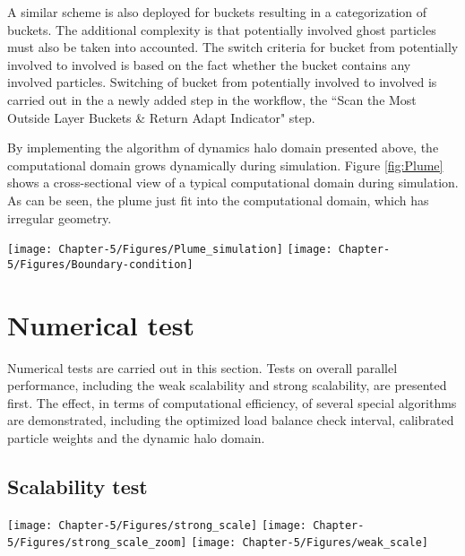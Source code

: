 A similar scheme is also deployed for buckets resulting in a categorization of buckets. The additional complexity is that potentially involved ghost particles must also be taken into accounted. The switch criteria for bucket from potentially involved to involved is based on the fact whether the bucket contains any involved particles. Switching of bucket from potentially involved to involved is carried out in the a newly added step in the workflow, the ``Scan the Most Outside Layer
Buckets \& Return Adapt Indicator" step.

By implementing the algorithm of dynamics halo domain presented above, the computational domain grows dynamically during simulation. Figure \ref{fig:Plume} shows a cross-sectional view of a typical computational domain during simulation. As can be seen, the plume just fit into the computational domain, which has irregular geometry.

\begin{figure*}[!t]
\centering
\texttt{[image: Chapter-5/Figures/Plume\_simulation]}
\hfil
\texttt{[image: Chapter-5/Figures/Boundary-condition]}
\caption{The left figure shows contour of mass fraction at specific time during simulation. The volcano plume is represented by high mass fraction region. The right figure is a cross-section view of the computational domain at corresponding time.}
\label{fig:Plume}
\end{figure*}

\section{Numerical test} \label{sec:numerical-tests-computation}
Numerical tests are carried out in this section. Tests on overall parallel performance, including the weak scalability and strong scalability, are presented first. The effect, in terms of computational efficiency, of several special algorithms are demonstrated, including the optimized load balance check interval, calibrated particle weights and the dynamic halo domain.

\subsection{Scalability test}
\begin{figure*}[!t]
\centering
\texttt{[image: Chapter-5/Figures/strong\_scale]}
\hfil
\texttt{[image: Chapter-5/Figures/strong\_scale\_zoom]}
\hfil
\texttt{[image: Chapter-5/Figures/weak\_scale]}
\caption{The left figure shows strong scalability tests result. middle figure is the zoomed view of first one. It is obviously shown that strong scalability is better when the problem size is larger. The right figure is weak scalability test results}
\label{fig:2cases_efficiency}
\end{figure*}

